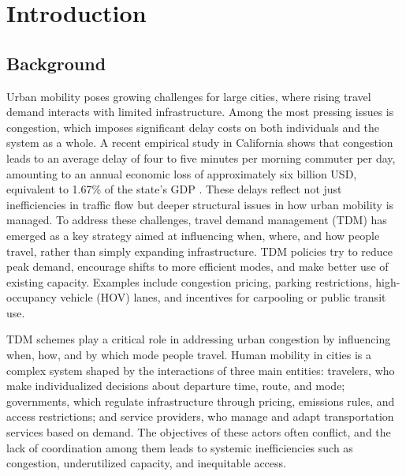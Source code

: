 
\chapter{Introduction}
\label{cha:introduction}

\section{Background}
Urban mobility poses growing challenges for large cities, where rising travel demand interacts with limited infrastructure. Among the most pressing issues is congestion, which imposes significant delay costs on both individuals and the system as a whole. A recent empirical study in California shows that congestion leads to an average delay of four to five minutes per morning commuter per day, amounting to an annual economic loss of approximately six billion USD, equivalent to 1.67\% of the state's GDP \parencite{kim2022congestion}. These delays reflect not just inefficiencies in traffic flow but deeper structural issues in how urban mobility is managed. To address these challenges, travel demand management (TDM) has emerged as a key strategy aimed at influencing when, where, and how people travel,
rather than simply expanding infrastructure. TDM policies try to reduce peak demand, encourage shifts to more efficient modes, and make better use of existing capacity. Examples include congestion pricing, parking restrictions, high-occupancy vehicle (HOV) lanes, and incentives for carpooling or public transit use.  

TDM schemes play a critical role in addressing urban congestion by influencing when, how, and by which mode people travel.  Human mobility in cities is a complex system shaped by the interactions of three main entities: travelers, who make individualized decisions about departure time, route, and mode; governments, which regulate infrastructure through pricing, emissions rules, and access restrictions; and service providers, who manage and adapt transportation services based on demand. The objectives of these actors often conflict, and the lack of coordination among them leads to systemic inefficiencies such as congestion, underutilized capacity, and inequitable access. 

